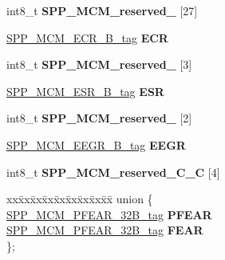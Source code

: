 \begin{DoxyCompactItemize}
int8\+\_\+t {\bfseries S\+P\+P\+\_\+\+M\+C\+M\+\_\+reserved\+\_} \mbox{[}27\mbox{]}
\item 
\mbox{\label{structSPP__MCM__struct__tag_a2b56001232797f0a107a9c246a0e02ea}} 
\mbox{\hyperlink{unionSPP__MCM__ECR__8B__tag}{S\+P\+P\+\_\+\+M\+C\+M\+\_\+\+E\+C\+R\+\_\+B\+\_\+tag}} {\bfseries E\+CR}
\item 
\mbox{\label{structSPP__MCM__struct__tag_ade8020950bc37e0bdd7575e6a7470ad1}} 
int8\+\_\+t {\bfseries S\+P\+P\+\_\+\+M\+C\+M\+\_\+reserved\+\_} \mbox{[}3\mbox{]}
\item 
\mbox{\label{structSPP__MCM__struct__tag_af04639fb3ed78fdb7d7651aeb9af0e28}} 
\mbox{\hyperlink{unionSPP__MCM__ESR__8B__tag}{S\+P\+P\+\_\+\+M\+C\+M\+\_\+\+E\+S\+R\+\_\+B\+\_\+tag}} {\bfseries E\+SR}
\item 
\mbox{\label{structSPP__MCM__struct__tag_a2c353f25f6ea9cfa6d5935ebeb184ad2}} 
int8\+\_\+t {\bfseries S\+P\+P\+\_\+\+M\+C\+M\+\_\+reserved\+\_} \mbox{[}2\mbox{]}
\item 
\mbox{\label{structSPP__MCM__struct__tag_ad50774da89c3302561e3715aa0374be5}} 
\mbox{\hyperlink{unionSPP__MCM__EEGR__16B__tag}{S\+P\+P\+\_\+\+M\+C\+M\+\_\+\+E\+E\+G\+R\+\_\+B\+\_\+tag}} {\bfseries E\+E\+GR}
\item 
\mbox{\label{structSPP__MCM__struct__tag_ad6c2d828d05f1ca26e9098a40c606dbb}} 
int8\+\_\+t {\bfseries S\+P\+P\+\_\+\+M\+C\+M\+\_\+reserved\+\_\+C\+\_\+C} \mbox{[}4\mbox{]}
\item 
\mbox{\label{structSPP__MCM__struct__tag_a8d15696c4e383367b8d220304e738f35}} 
\begin{tabbing}
xx\=xx\=xx\=xx\=xx\=xx\=xx\=xx\=xx\=\kill
union \{\\
\>\mbox{\hyperlink{unionSPP__MCM__PFEAR__32B__tag}{SPP\_MCM\_PFEAR\_32B\_tag}} {\bfseries PFEAR}\\
\>\mbox{\hyperlink{unionSPP__MCM__PFEAR__32B__tag}{SPP\_MCM\_PFEAR\_32B\_tag}} {\bfseries FEAR}\\
\}; \\


\end{tabbing}
\end{DoxyCompactItemize}
